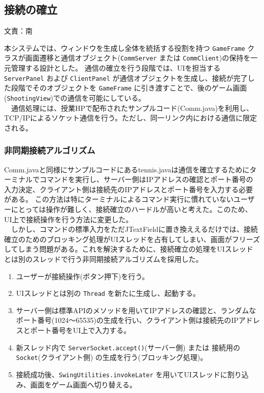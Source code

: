 \documentclass[11pt,a4j]{jarticle}
\begin{document}
\subsection{接続の確立}
\begin{flushright}
  文責：南
\end{flushright}
本システムでは、ウィンドウを生成し全体を統括する役割を持つ \texttt{GameFrame} クラスが画面遷移と通信オブジェクト(\texttt{CommServer} または \texttt{CommClient})の保持を一元管理する設計とした。
通信の確立を行う段階では、UIを担当する \texttt{ServerPanel} および \texttt{ClientPanel} が通信オブジェクトを生成し、接続が完了した段階でそのオブジェクトを \texttt{GameFrame} に引き渡すことで、後のゲーム画面(\texttt{ShootingView})での通信を可能にしている。\\
　通信処理には、授業HPで配布されたサンプルコード(Comm.java)を利用し、TCP/IPによるソケット通信を行う。ただし、同一リンク内における通信に限定される。

\subsubsection{非同期接続アルゴリズム}
Comm.javaと同様にサンプルコードにあるtennis.javaは通信を確立するためにターミナルでコマンドを実行し、サーバー側はIPアドレスの確認とポート番号の入力決定、クライアント側は接続先のIPアドレスとポート番号を入力する必要がある。
この方法は特にターミナルによるコマンド実行に慣れていないユーザーにとっては操作が難しく、接続確立のハードルが高いと考えた。このため、UI上で接続操作を行う方法に変更した。\\
　しかし、コマンドの標準入力をただJTextFieldに置き換ええるだけでは、接続確立のためのブロッキング処理がUIスレッドを占有してしまい、画面がフリーズしてしまう問題がある。これを解決するために、接続確立の処理をUIスレッドとは別のスレッドで行う非同期接続アルゴリズムを採用した。

\begin{enumerate}
    \item ユーザーが接続操作(ボタン押下)を行う。
    \item UIスレッドとは別の \texttt{Thread} を新たに生成し、起動する。
    \item サーバー側は標準APIのメソッドを用いてIPアドレスの確認と、ランダムなポート番号(1024～65535)の生成を行い、クライアント側は接続先のIPアドレスとポート番号をUI上で入力する。
    \item 新スレッド内で \texttt{ServerSocket.accept()}(サーバー側) または 接続用の\texttt{Socket}(クライアント側) の生成を行う(ブロッキング処理)。
    \item 接続成功後、\texttt{SwingUtilities.invokeLater} を用いてUIスレッドに割り込み、画面をゲーム画面へ切り替える。
\end{enumerate}
\end{document}
